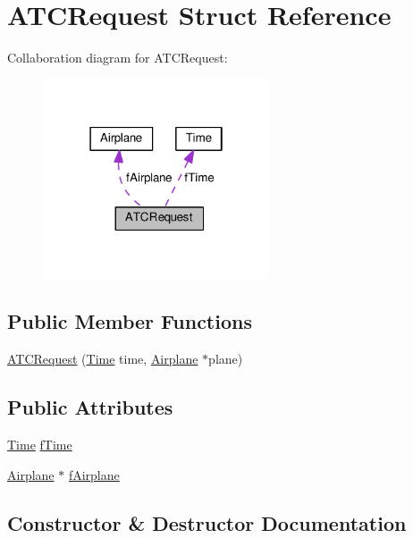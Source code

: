 \hypertarget{structATCRequest}{}\section{A\+T\+C\+Request Struct Reference}
\label{structATCRequest}


Collaboration diagram for A\+T\+C\+Request\+:\nopagebreak
\begin{figure}[H]
\begin{center}
\leavevmode
\includegraphics[width=190pt]{structATCRequest__coll__graph}
\end{center}
\end{figure}
\subsection*{Public Member Functions}
\begin{DoxyCompactItemize}
\item 
\hyperlink{structATCRequest_a26bd53c68bee460010bf80dc3c6dec12}{A\+T\+C\+Request} (\hyperlink{classTime}{Time} time, \hyperlink{classAirplane}{Airplane} $\ast$plane)
\end{DoxyCompactItemize}
\subsection*{Public Attributes}
\begin{DoxyCompactItemize}
\item 
\hyperlink{classTime}{Time} \hyperlink{structATCRequest_a6ef577c542082570fc934078994d622f}{f\+Time}
\item 
\hyperlink{classAirplane}{Airplane} $\ast$ \hyperlink{structATCRequest_a681215e14c24388ae811f182c33e4403}{f\+Airplane}
\end{DoxyCompactItemize}


\subsection{Constructor \& Destructor Documentation}
